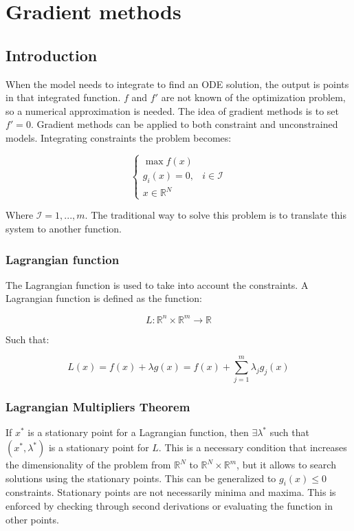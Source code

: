 \graphicspath{{chapters/09/images}}
\chapter{Gradient methods}

\section{Introduction}
When the model needs to integrate to find an ODE solution, the output is points in that integrated function.
$f$ and $f'$ are not known of the optimization problem, so a numerical approximation is needed.
The idea of gradient methods is to set $f'=0$.
Gradient methods can be applied to both constraint and unconstrained models.
Integrating constraints the problem becomes:

$$\begin{cases}\max f(x) &  \\ g_i(x)=0, & i \in \mathcal{I} \\ x \in \mathbb{R}^N &\end{cases}$$

Where $\mathcal{I}= 1,...,m$.
The traditional way to solve this problem is to translate this system to another function.

  \subsection{Lagrangian function}
  The Lagrangian function is used to take into account the constraints.
  A Lagrangian function is defined as the function:

  $$L: \mathbb{R}^n \times \mathbb{R}^m \rightarrow \mathbb{R}$$

  Such that:

  $$L(x)= f(x) + \lambda g(x) = f(x) + \sum_{j=1}^m \lambda_j g_j(x)$$

  \subsection{Lagrangian Multipliers Theorem}
  If $x^*$ is a stationary point for a Lagrangian function, then $\exists \lambda^*$ such that $(x^*, \lambda^*)$ is a stationary point for $L$.
  This is a necessary condition that increases the dimensionality of the problem from $\mathbb{R}^N$ to $\mathbb{R}^N \times \mathbb{R}^m$, but it allows to search solutions using the stationary points.
  This can be generalized to $g_i(x)\leq 0$ constraints.
  Stationary points are not necessarily minima and maxima.
  This is enforced by checking through second derivations or evaluating the function in other points.

